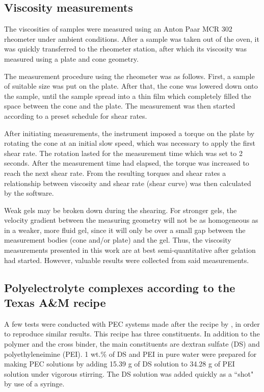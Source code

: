 \documentclass[nanomaterials,article,submit,moreauthors,pdftex]{Definitions/mdpi}
\begin{document}
\subsection{Viscosity measurements}
The viscosities of samples were measured using an Anton Paar MCR 302 rheometer under ambient conditions. After a sample was taken out of the oven, it was quickly transferred to the rheometer station, after which its viscosity was measured using a plate and cone geometry.

The measurement procedure using the rheometer was as follows. First, a sample of suitable size was put on the plate. After that, the cone was lowered down onto the sample, until the sample spread into a thin film which completely filled the space between the cone and the plate. The measurement was then started according to a preset schedule for shear rates. 

After initiating measurements, the instrument imposed a torque on the plate by rotating the cone at an initial slow speed, which was necessary to apply the first shear rate. The rotation lasted for the measurement time which was set to 2 seconds. After the measurement time had elapsed, the torque was increased to reach the next shear rate. From the resulting torques and shear rates a relationship between viscosity and shear rate (shear curve) was then calculated by the software.

Weak gels may be broken down during the shearing. For stronger gels, the velocity gradient between the measuring geometry will not be as homogeneous as in a weaker, more fluid gel, since it will only be over a small gap between the measurement bodies (cone and/or plate) and the gel. Thus, the viscosity measurements presented in this work are at best semi-quantitative after gelation had started. However, valuable results were collected from said measurements.

\subsection{Polyelectrolyte complexes according to the Texas A\&M recipe \citep{Johnson2010}\label{sec:PEC}}
A few tests were conducted with PEC systems made after the recipe by \citet{Johnson2010}, in order to reproduce similar results. This recipe has three constituents. In addition to the polymer and the  cross binder, the main constituents are dextran sulfate (DS)  and polyethyleneimine (PEI).
1 wt.\% of DS and PEI in pure water were prepared for making PEC solutions by adding 15.39 g of DS solution to 34.28 g of PEI solution under vigorous stirring. The DS solution was added quickly as a ``shot" by use of a syringe.
\end{document}
